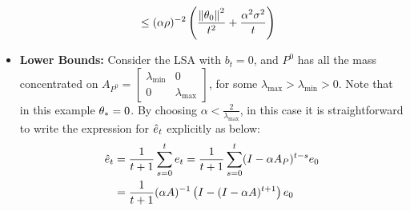 \begin{itemize}[leftmargin=*, before = \leavevmode\vspace{-\baselineskip}]
\begin{example}
\begin{align*}
&\leq (\alpha\rho)^{-2}\left(\frac{\left\| \theta_0\right\|^2}{t^2}+\frac{\alpha^2\sigma^2}{t}\right)
\end{align*}
\end{example}
\item \textbf{Lower Bounds:}
Consider the LSA with $b_t=0$, and $P^0$ has all the mass concentrated on $A_{P^0}=\begin{bmatrix} \lambda_{\min} &0\\ 0& \lambda_{\max}\end{bmatrix}$, for some $\lambda_{\max}>\lambda_{\min}>0$. Note that in this example $\theta_*=0$.
By choosing $\alpha<\frac2{\lambda_{\max}}$, in this case it is straightforward to write the expression for $\hat{e}_t$ explicitly as below:
\begin{align*}
\hat{e}_t&=\frac{1}{t+1}\sum_{s=0}^t e_t = \frac{1}{t+1}\sum_{s=0}^t (I-\alpha A_P)^{t-s} e_0\\
&=\frac{1}{t+1}(\alpha A)^{-1}\left(I-(I-\alpha A)^{t+1}\right)e_0
\end{align*}
\begin{comment}
\begin{align*}
\norm{\eh_t}^2&=\frac{1}{(t+1)^2}\norm{(\alpha A_P)^{-1}\left(I-(I-\alpha A_P)^{t+1}\right)e_0}^2
&\leq\frac{1}{(t+1)^2}\alpha^2\norm{A_P^{-1}}^2\norm{e_0}^2
\end{align*}
\end{comment}


\end{itemize}
